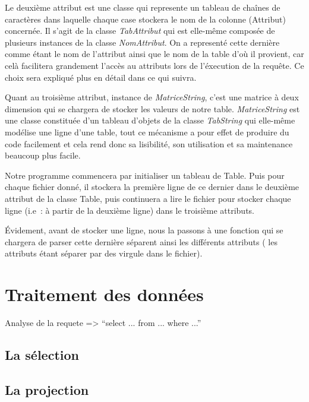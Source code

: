 \documentclass[oneside,13pt,a4paper]{report}
\begin{document}

Le deuxième attribut est une classe qui represente un tableau de chaînes de caractères dans laquelle chaque case stockera le nom de la colonne (Attribut) concernée. 
Il s'agit de la classe \textit{TabAttribut} qui est elle-même composée de plusieurs instances de la classe \textit{NomAttribut}.
On a representé cette dernière comme étant le nom de l'attribut ainsi que le nom de la table d'où il provient, 
car celà facilitera grandement l'accès au attributs lors de l'éxecution de la requête. Ce choix sera expliqué plus en détail dans ce qui suivra.

Quant au troisième attribut, instance de \textit{MatriceString}, c’est une matrice à deux dimension qui se chargera de stocker les valeurs de notre table.
\textit{MatriceString} est une classe constituée d'un tableau d'objets de la classe \textit{TabString} qui elle-même modélise une ligne d'une table, tout ce mécanisme a pour effet de produire du code facilement et cela rend donc sa lisibilité, son utilisation et sa maintenance beaucoup plus facile.

Notre programme commencera par initialiser un tableau de Table. Puis pour chaque fichier donné, il stockera la première ligne de ce dernier dans le deuxième attribut de la classe Table, puis continuera a lire le fichier pour stocker chaque ligne (i.e : à partir de la deuxième ligne) dans le troisième attributs.

Évidement, avant de stocker une ligne, nous la passons à une fonction qui se chargera de parser cette dernière séparent ainsi les différents attributs ( les attributs étant séparer par des virgule dans le fichier).

\section{Traitement des données}

Analyse de la requete => \enquote{select ... from ... where ...}

\subsection{La sélection}

\subsection{La projection}
\end{document}
